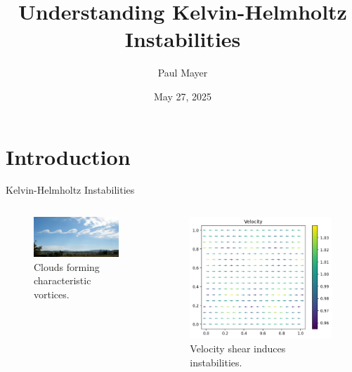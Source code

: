 \documentclass[17pt, t, lualatex]{beamer}
\title{Understanding Kelvin-Helmholtz Instabilities}
\date{May 27, 2025}
\institute[KTH]{KTH Royal Institute of Technology}
\author{Paul Mayer}
\begin{document}
\inserttitlepage

\section{Introduction}

\begin{frame}{Kelvin-Helmholtz Instabilities}
\begin{columns}
\begin{column}{0.5\textwidth}
\begin{center}
    \begin{figure}
        \centering
        \includegraphics[width=1\linewidth]{imgs/clouds}
        \caption{Clouds forming characteristic vortices.}
        \label{fig:clouds}
    \end{figure}
\end{center}
\end{column}
\begin{column}{0.5\textwidth}
\begin{center}
    \begin{figure}
        \centering
        \includegraphics[width=.7\linewidth]{imgs/shear}
        \caption{Velocity shear induces instabilities.}
        \label{fig:shear}
    \end{figure}
\end{center}
\end{column}
\end{columns}
\end{frame}
\end{document}
